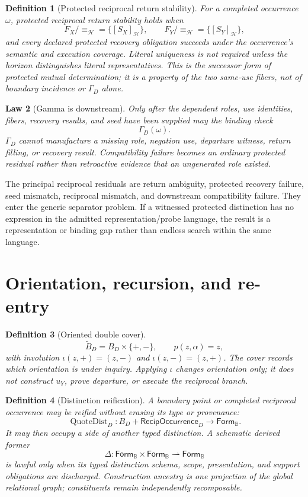 \documentclass[11pt,oneside]{article}
\newtheorem{definition}{Definition}[section]
\newtheorem{law}[definition]{Law}
\newcommand{\B}{\mathbb B}
\begin{document}
\begin{definition}[Protected reciprocal return stability]\label{def:reciprocal-return-stability}
For a completed occurrence \(\omega\), protected reciprocal return stability holds when
\[
F_X/{\equiv_{\mathcal H}}=\{[S_X]_{\mathcal H}\},
\qquad
F_Y/{\equiv_{\mathcal H}}=\{[S_Y]_{\mathcal H}\},
\]
and every declared protected recovery obligation succeeds under the occurrence's semantic and execution coverage.  Literal uniqueness is not required unless the horizon distinguishes literal representatives.  This is the successor form of protected mutual determination; it is a property of the two same-use fibers, not of boundary incidence or \(\Gamma_D\) alone.
\end{definition}

\begin{law}[Gamma is downstream]\label{law:gamma-downstream}
Only after the dependent roles, use identities, fibers, recovery results, and seed have been supplied may the binding check
\[
\boxed{\Gamma_D(\omega).}
\]
\(\Gamma_D\) cannot manufacture a missing role, negation use, departure witness, return filling, or recovery result.  Compatibility failure becomes an ordinary protected residual rather than retroactive evidence that an ungenerated role existed.
\end{law}

The principal reciprocal residuals are return ambiguity, protected recovery failure, seed mismatch, reciprocal mismatch, and downstream compatibility failure.  They enter the generic separator problem.  If a witnessed protected distinction has no expression in the admitted representation/probe language, the result is a representation or binding gap rather than endless search within the same language.

\section{Orientation, recursion, and re-entry}

\begin{definition}[Oriented double cover]\label{def:double-cover}
\[
\widetilde B_D=B_D\times\{+,-\},
\qquad
p(z,\alpha)=z,
\]
with involution \(\iota(z,+)=(z,-)\) and \(\iota(z,-)=(z,+)\).  The cover records which orientation is under inquiry.  Applying \(\iota\) changes orientation only; it does not construct \(u_Y\), prove departure, or execute the reciprocal branch.
\end{definition}

\begin{definition}[Distinction reification]
A boundary point or completed reciprocal occurrence may be reified without erasing its type or provenance:
\[
\operatorname{QuoteDist}_D:
B_D+\mathsf{RecipOccurrence}_D
\to\mathsf{Form}_{\B}.
\]
It may then occupy a side of another typed distinction.  A schematic derived former
\[
\Delta:\mathsf{Form}_{\B}\times\mathsf{Form}_{\B}
\rightharpoonup\mathsf{Form}_{\B}
\]
is lawful only when its typed distinction schema, scope, presentation, and support obligations are discharged.  Construction ancestry is one projection of the global relational graph; constituents remain independently recomposable.
\end{definition}
\end{document}
